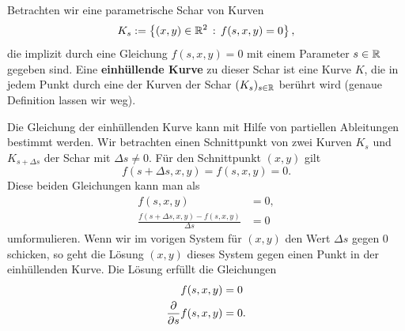 \begin{bem}
	Betrachten wir eine parametrische Schar von Kurven 
	\[
		K_s := \left\{  (x,y) \in \mathbb{R}^2 \,:\, f(s,x,y) = 0 \right\},
	\]
	die implizit durch eine Gleichung $f(s,x,y) = 0$ mit einem Parameter $s \in \mathbb{R}$ gegeben sind. Eine \textbf{einhüllende Kurve} zu dieser Schar ist eine Kurve $K$, die in jedem Punkt durch eine der Kurven der Schar $(K_s)_{s \in \mathbb{R}}$ berührt wird (genaue Definition lassen wir weg). 
	
	Die Gleichung der einhüllenden Kurve kann mit Hilfe von partiellen Ableitungen bestimmt werden. Wir betrachten einen Schnittpunkt von zwei Kurven $K_s$ und $K_{s + \Delta s}$ der Schar mit $\Delta s \ne 0$. Für den Schnittpunkt $(x,y)$ gilt 
	\[
		f(s + \Delta s, x , y ) = f(s,x,y) = 0.
	\]
	Diese beiden Gleichungen kann man als 
	\begin{align*}
		f(s,x,y) & = 0,
\\
		\frac{f(s+\Delta s, x , y ) - f(s,x,y)}{\Delta s} & = 0
	\end{align*} 
	umformulieren. Wenn  wir im vorigen System für $(x,y)$ den Wert $\Delta s$ gegen $0$ schicken, so geht die Lösung $(x,y)$ dieses System gegen einen Punkt in der einhüllenden Kurve. Die Lösung erfüllt die Gleichungen 
	\begin{align*}
		f(s,x,y) & = 0 
\\		\frac{\partial }{\partial s} f(s,x,y) & = 0.
	\end{align*} 
\end{bem} 

